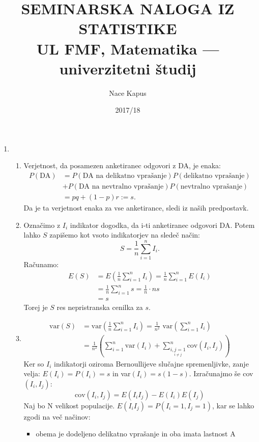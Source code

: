 \documentclass[12pt, letterpaper, twoside]{article}
\title{SEMINARSKA NALOGA IZ STATISTIKE  \\
	\Large UL FMF, Matematika --- univerzitetni študij}
\author{Nace Kapus}
\date{2017/18}
\begin{document}
 
\begin{titlepage}
\maketitle
\end{titlepage}

\begin{enumerate}
	\item 
	\begin{enumerate}
		\item Verjetnost, da posamezen anketiranec odgovori z DA, je enaka:
		\begin{align*}
		P(\text{DA})&=P(\text{DA na delikatno vprašanje})P(\text{delikatno vprašanje}) \\
		&+P(\text{DA na nevtralno vprašanje})P(\text{nevtralno vprašanje}) \\
		&=pq+(1-p)r:=s.
		\end{align*}
		Da je ta verjetnost enaka za vse anketirance, sledi iz naših predpostavk.
		\item Označimo z $I_i$ indikator dogodka, da i-ti anketiranec odgovori DA. Potem lahko $S$ zapišemo kot vsoto indikatorjev na sledeč način:
		$$S = \frac{1}{n}\sum_{i=1}^{n}I_i.$$
		Računamo:
		\begin{align*}
		E(S)&=E\left(\frac{1}{n}\sum_{i=1}^{n}I_i\right) 
		=\frac{1}{n}\sum_{i=1}^{n}E(I_i) \\
		&=\frac{1}{n}\sum_{i=1}^{n}s 
		=\frac{1}{n} \cdot ns \\
		&=s
		\end{align*}
		Torej je $S$ res nepristranska cenilka za $s$.
		\item \begin{align*}
			\text{var}(S)&=\text{var}\left(\frac{1}{n}\sum_{i=1}^{n}I_i\right)=\frac{1}{n^2}\text{ var}\left(\sum_{i=1}^{n}I_i\right) \\
			&=\frac{1}{n^2}\left(\sum_{i=1}^{n}\text{var}(I_i)+\sum_{\underset{i\neq j}{i,j=1}}^{n}\text{cov}(I_i,I_j) \right)
		\end{align*}
		Ker so $I_i$ indikatorji oziroma Bernoullijeve slučajne spremenljivke, zanje velja: $E(I_i)=P(I_i)=s$
		in var$(I_i)=s(1-s)$. Izračunajmo še cov$(I_i,I_j)$:
		$$
		\text{cov}(I_i,I_j)=E(I_i I_j)-E(I_i)E(I_j)
		$$
		Naj bo N velikost populacije. $E(I_i I_j) = P(I_i = 1,I_j =1)$, kar se lahko zgodi na več načinov:
		\begin{itemize}
			\item obema je dodeljeno delikatno vprašanje in oba imata lastnost A

\end{itemize}
\end{enumerate}
\end{enumerate}
\end{document}
